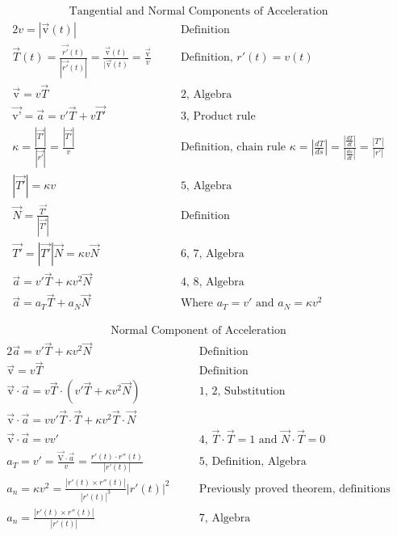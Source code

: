 \documentclass{article}
\begin{document}
\begin{gather*}
    \text{Tangential and Normal Components of Acceleration}
\end{gather*}
\begin{alignat}{2}
    v=|\Vec{\text{v}}(t)|                           &\quad &\text{Definition}
    \\
    \Vec{T}(t)=\frac{\Vec{r'}(t)}{|\Vec{r'}(t)|}=\frac{\Vec{\text{v}}(t)}{|\Vec{\text{v}}(t)}=\frac{\Vec{\text{v}}}{v}                &\quad &\text{Definition, }r'(t)=v(t)
    \\
    \Vec{\text{v}}=v\Vec{T}                         &\quad &\text{2, Algebra}
    \\
    \Vec{\text{v'}}=\Vec{a}=v'\Vec{T}+v\Vec{T'}     &\quad &\text{3, Product rule}
    \\
    \kappa=\frac{|\Vec{T'}|}{|\Vec{r'}|}=\frac{|\Vec{T'}|}{v}    &\quad &\text{Definition, chain rule }\kappa=|\frac{dT}{ds}|=\frac{|\frac{dT}{dt}|}{|\frac{ds}{dt}|}=\frac{|T'|}{|r'|}
    \\
    |\Vec{T'}|=\kappa v                             &\quad &\text{5, Algebra}
    \\
    \Vec{N}=\frac{\Vec{T'}}{|\vec{T'}|}                   &\quad &\text{Definition}
    \\
    \vec{T'}=|\vec{T'}|\vec{N}=\kappa v\vec{N}      &\quad &\text{6, 7, Algebra}
    \\
    \vec{a}=v'\vec{T}+\kappa v^2\vec{N}             &\quad &\text{4, 8, Algebra}
    \\
    \vec{a}=a_T\vec{T}+a_N\vec{N}                   &\quad &\text{Where }a_T=v'\text{ and }a_N=\kappa v^2
\end{alignat}

\begin{gather*}
    \text{Normal Component of Acceleration}
\end{gather*}
\begin{alignat}{2}
    \Vec{a}=v'\Vec{T}+\kappa v^2\Vec{N}              &\quad &\text{Definition}
    \\
    \Vec{\text{v}}=v\Vec{T}                         &\quad &\text{Definition}
    \\
    \Vec{\text{v}}\cdot\Vec{a}=v\Vec{T}\cdot(v'\Vec{T}+\kappa v^2\Vec{N})   &\quad &\text{1, 2, Substitution}
    \\
    \Vec{\text{v}}\cdot \Vec{a}=vv'\Vec{T}\cdot\Vec{T}+\kappa v^2\Vec{T}\cdot\Vec{N}
    \\
    \Vec{\text{v}}\cdot\Vec{a}=vv'                  &\quad &\text{4, }\Vec{T}\cdot\Vec{T}=1\text{ and }\Vec{N}\cdot\Vec{T}=0
    \\
    a_T=v'=\frac{\Vec{\text{V}}\cdot\Vec{a}}{v}=\frac{r'(t)\cdot r''(t)}{|r'(t)|}   &\quad &\text{5, Definition, Algebra}
    \\
    a_n=\kappa v^2=\frac{|r'(t)\times r''(t)|}{|r'(t)|^3}|r'(t)|^2  &\quad &\text{Previously proved theorem, definitions}
    \\
    a_n=\frac{|r'(t)\times r''(t)|}{|r'(t)|}        &\quad &\text{7, Algebra}
\end{alignat}
\end{document}
